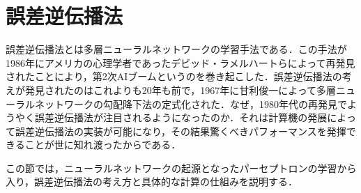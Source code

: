 \documentclass[a4paper,11pt]{jsreport}
\begin{document}
\section{誤差逆伝播法}
誤差逆伝播法とは多層ニューラルネットワークの学習手法である．この手法が1986年にアメリカの心理学者であったデビッド・ラメルハートらによって再発見されたことにより，第2次AIブームというのを巻き起こした．誤差逆伝播法の考えが発見されたのはこれよりも20年も前で，1967年に甘利俊一によって多層ニューラルネットワークの勾配降下法の定式化された．なぜ，1980年代の再発見でようやく誤差逆伝播法が注目されるようになったのか．それは計算機の発展によって誤差逆伝播法の実装が可能になり，その結果驚くべきパフォーマンスを発揮できることが世に知れ渡ったからである．\par
この節では，ニューラルネットワークの起源となったパーセプトロンの学習から入り，誤差逆伝播法の考え方と具体的な計算の仕組みを説明する．
\end{document}
